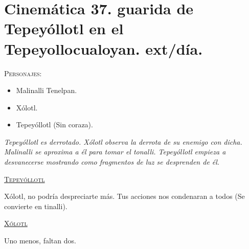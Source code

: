 \documentclass[11pt,letterpaper]{article}
\begin{document}
\section{Cinemática 37. guarida de Tepeyóllotl en el Tepeyollocualoyan. ext/día. }
 \textsc{Personajes}:
 \begin{itemize}
 \item Malinalli Tenelpan.
 \item Xólotl.
 \item Tepeyóllotl (Sin coraza).
 \end{itemize}
\textit{Tepeyóllotl es derrotado. Xólotl observa la derrota de su enemigo con dicha. Malinalli se aproxima a él para tomar el tonalli. Tepeyóllotl empieza a desvanecerse mostrando como fragmentos de luz se desprenden de él.}
\begin{center}
\textsc{\underline{Tepeyóllotl}}
\\
\par
Xólotl, no podría despreciarte más. Tus acciones nos condenaran a todos (Se convierte en tinalli).
\\
\par
\textsc{\underline{Xólotl}}
\\
\par
Uno menos, faltan dos. 
\end{center}
 
\end{document}
